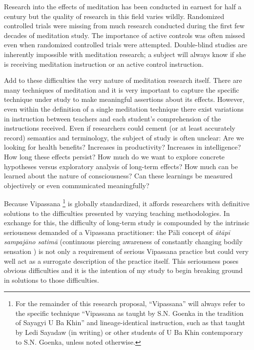 \documentclass[a4paper, amsfonts, amssymb, amsmath, reprint, showkeys, nofootinbib, twoside]{revtex4-1}
\begin{document}
Research into the effects of meditation has been conducted in earnest for half a
century but the quality of research in this field varies wildly. Randomized
controlled trials were missing from much research conducted during the first few
decades of meditation study. The importance of active controls was often missed even
when randomized controlled trials were attempted. Double-blind studies are inherently
impossible with meditation research; a subject will always know if she is receiving
meditation instruction or an active control instruction. \cite{goleman2017altered}

Add to these difficulties the very nature of meditation research itself. There are
many techniques of meditation and it is very important to capture the specific
technique under study to make meaningful assertions about its
effects. \cite{goleman2017altered} However, even within the definition of a single
meditation technique there exist variations in instruction between
teachers and each student's comprehension of the instructions
received. \cite{davidson2015conceptual} Even if researchers could cement (or at least
accurately record) semantics and terminology, the subject of study is often unclear:
Are we looking for health benefits? Increases in productivity? Increases in
intelligence? How long these effects persist? How much do we want to explore concrete
hypotheses versus exploratory analysis of long-term effects? How much can be learned
about the nature of consciousness? Can these learnings be measured objectively or
even communicated meaningfully?

Because Vipassana \footnote{For the remainder of this research proposal,
  ``Vipassana'' will always refer to the specific technique ``Vipassana as taught by S.N. Goenka in the
  tradition of Sayagyi U Ba Khin'' and lineage-identical instruction, such as that
  taught by Ledi Sayadaw (in writing) or other students of U Ba Khin contemporary
  to S.N. Goenka, unless noted otherwise.} is globally standardized, it affords
researchers with definitive
solutions to the difficulties presented by varying teaching methodologies. In
exchange for this, the difficulty of long-term study is compounded by the intrinsic
seriousness demanded of a Vipassana practitioner: the Pāli concept of \textit{ātāpī
  sampajāno satimā} (continuous piercing awareness of constantly
changing bodily sensation \cite{goenka1999discourses}) is not only a
requirement of serious Vipassana practice but could very well act as a surrogate
description of the practice itself. This seriousness poses obvious difficulties and
it is the intention of my study to begin breaking ground in solutions to those
difficulties.
\end{document}
